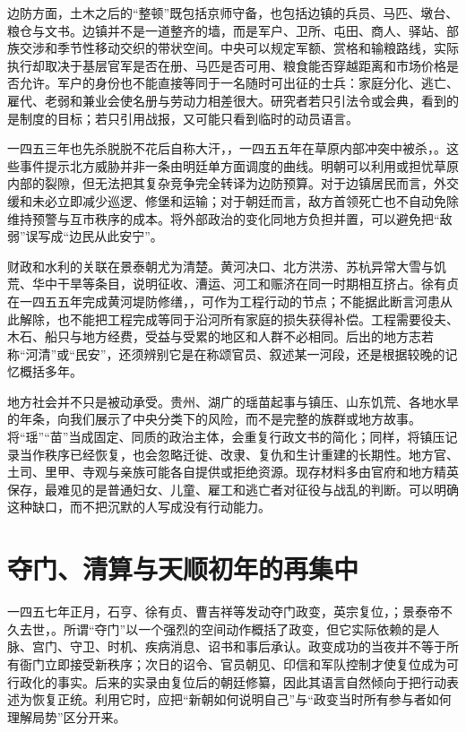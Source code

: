 边防方面，土木之后的“整顿”既包括京师守备，也包括边镇的兵员、马匹、墩台、粮仓与文书。边镇并不是一道整齐的墙，而是军户、卫所、屯田、商人、驿站、部族交涉和季节性移动交织的带状空间。中央可以规定军额、赏格和输粮路线，实际执行却取决于基层官军是否在册、马匹是否可用、粮食能否穿越距离和市场价格是否允许。军户的身份也不能直接等同于一名随时可出征的士兵：家庭分化、逃亡、雇代、老弱和兼业会使名册与劳动力相差很大。研究者若只引法令或会典，看到的是制度的目标；若只引用战报，又可能只看到临时的动员语言。

一四五三年也先杀脱脱不花后自称大汗，，一四五五年在草原内部冲突中被杀，。这些事件提示北方威胁并非一条由明廷单方面调度的曲线。明朝可以利用或担忧草原内部的裂隙，但无法把其复杂竞争完全转译为边防预算。对于边镇居民而言，外交缓和未必立即减少巡逻、修堡和运输；对于朝廷而言，敌方首领死亡也不自动免除维持预警与互市秩序的成本。将外部政治的变化同地方负担并置，可以避免把“敌弱”误写成“边民从此安宁”。

财政和水利的关联在景泰朝尤为清楚。黄河决口、北方洪涝、苏杭异常大雪与饥荒、华中干旱等条目，说明征收、漕运、河工和赈济在同一时期相互挤占。徐有贞在一四五五年完成黄河堤防修缮，，可作为工程行动的节点；不能据此断言河患从此解除，也不能把工程完成等同于沿河所有家庭的损失获得补偿。工程需要役夫、木石、船只与地方经费，受益与受累的地区和人群不必相同。后出的地方志若称“河清”或“民安”，还须辨别它是在称颂官员、叙述某一河段，还是根据较晚的记忆概括多年。

地方社会并不只是被动承受。贵州、湖广的瑶苗起事与镇压、山东饥荒、各地水旱的年条，向我们展示了中央分类下的风险，而不是完整的族群或地方故事。将“瑶”“苗”当成固定、同质的政治主体，会重复行政文书的简化；同样，将镇压记录当作秩序已经恢复，也会忽略迁徙、改隶、复仇和生计重建的长期性。地方官、土司、里甲、寺观与亲族可能各自提供或拒绝资源。现存材料多由官府和地方精英保存，最难见的是普通妇女、儿童、雇工和逃亡者对征役与战乱的判断。可以明确这种缺口，而不把沉默的人写成没有行动能力。

\section{夺门、清算与天顺初年的再集中}

一四五七年正月，石亨、徐有贞、曹吉祥等发动夺门政变，英宗复位，；景泰帝不久去世，。所谓“夺门”以一个强烈的空间动作概括了政变，但它实际依赖的是人脉、宫门、守卫、时机、疾病消息、诏书和事后承认。政变成功的当夜并不等于所有衙门立即接受新秩序；次日的诏令、官员朝见、印信和军队控制才使复位成为可行政化的事实。后来的实录由复位后的朝廷修纂，因此其语言自然倾向于把行动表述为恢复正统。利用它时，应把“新朝如何说明自己”与“政变当时所有参与者如何理解局势”区分开来。

